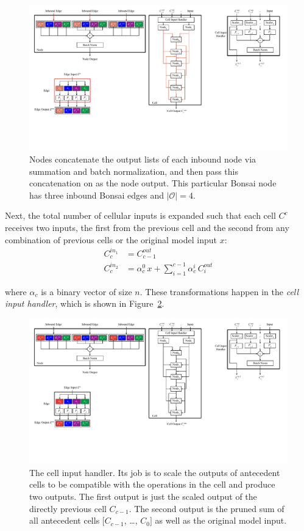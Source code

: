 \begin{figure}[ht!]
	\centering
	\includegraphics[width=\textwidth]{node}
	\caption[Bonsai node with three inbound Bonsai edges and $|\mathcal{O}|=4$]{
		Nodes concatenate the output lists of each inbound node via summation and batch normalization, and then pass this
concatenation on as the node output. This particular Bonsai node has three inbound Bonsai edges and $|\mathcal{O}|=4$.}
	\label{fig:bonsai_node_mainbody}
\end{figure}

Next, the total number of
cellular inputs is expanded such that each cell $C^c$ receives two inputs, the first from the previous cell and the
second from any combination of previous cells or the original model input $x$:
\begin{align}
	C^{in_1}_c &= C^{out}_{c-1} \\
	C^{in_2}_c &= \alpha_c^0 \, x + \sum_{i=1}^{c-1}{\alpha_c^i \, C^{out}_{i}} \label{eq:input_weights}
\end{align}

\noindent where $\alpha_c$ is a binary vector of size $n$. These transformations happen in the \textit{cell input handler}, which
is shown in Figure~\ref{fig:bonsai_ih_mainbody}.

\begin{figure}[ht]
	\centering
	\includegraphics[width=.5\textwidth]{input_handler}
	\caption[The cell input handler]{The cell input handler.  Its job is to scale the outputs of antecedent cells
	to be compatible with the operations in the cell and produce two outputs.
The first output is just the scaled output of the directly previous cell $C_{c-1}$. The second output is the pruned
sum of all antecedent cells [$C_{c-1}$, \dots, $C_{0}]$ as well as the original model input.}
	\label{fig:bonsai_ih_mainbody}
\end{figure}

